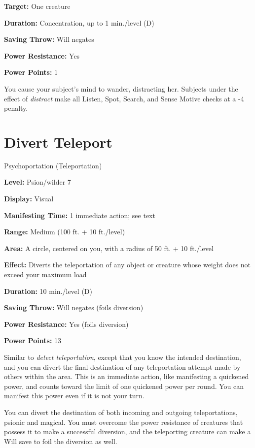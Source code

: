 \documentclass{article}
\begin{document}
\textbf{Target:} One creature

\textbf{Duration:} Concentration, up to 1 min./level (D)

\textbf{Saving Throw:} Will negates

\textbf{Power Resistance:} Yes

\textbf{Power Points:} 1

You cause your subject's mind to wander, distracting her. Subjects under the effect 
of \textit{distract }make all Listen, Spot, Search, and Sense Motive checks at 
a -4 penalty.

\vspace{12pt}
\section*{Divert Teleport}

Psychoportation (Teleportation)

\textbf{Level:} Psion/wilder 7

\textbf{Display:} Visual

\textbf{Manifesting Time:} 1 immediate action; see text

\textbf{Range:} Medium (100 ft. + 10 ft./level)

\textbf{Area:} A circle, centered on you, with a radius of 50 ft. + 10 ft./level

\textbf{Effect:} Diverts the teleportation of any object or creature whose weight 
does not exceed your maximum load

\textbf{Duration:} 10 min./level (D)

\textbf{Saving Throw:} Will negates (foils diversion)

\textbf{Power Resistance:} Yes (foils diversion)

\textbf{Power Points:} 13

Similar to \textit{detect teleportation}, except that you know the intended destination, 
and you can divert the final destination of any teleportation attempt made by others 
within the area. This is an immediate action, like manifesting a quickened power, 
and counts toward the limit of one quickened power per round. You can manifest 
this power even if it is not your turn.

You can divert the destination of both incoming and outgoing teleportations, psionic 
and magical. You must overcome the power resistance of creatures that possess it 
to make a successful diversion, and the teleporting creature can make a Will save 
to foil the diversion as well.
\end{document}
